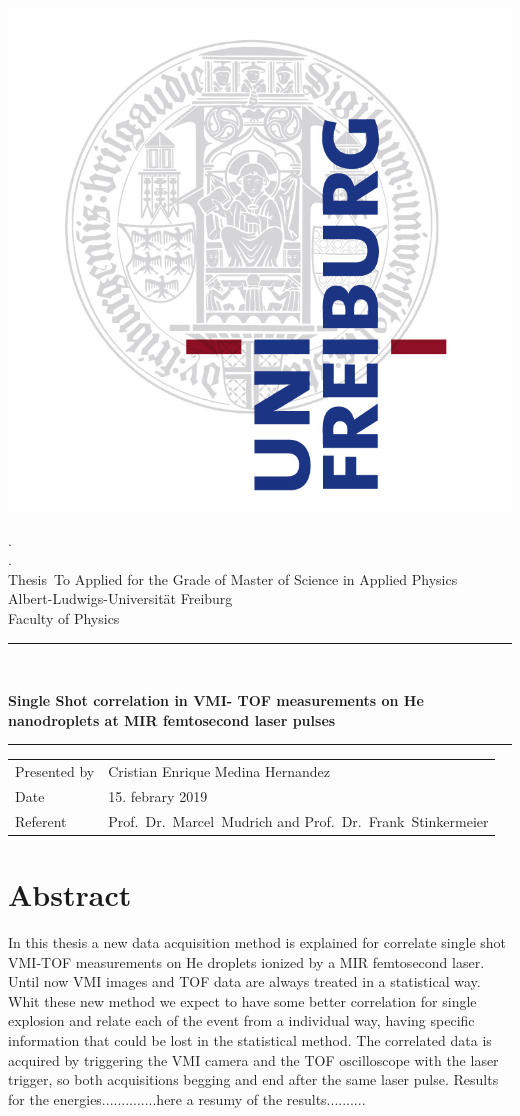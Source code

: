 \documentclass[a4paper,12pt,bibtotocnumbered, twosite]{scrreprt}
\newcommand{\titel}{Single Shot correlation in VMI- TOF measurements on He  nanodroplets at MIR femtosecond laser pulses}
\newcommand{\welchethesis}{To Applied for the Grade of Master of Science in Applied Physics}
\newcommand{\thesisofwas}{Thesis}
\newcommand{\welchesInstitute}{Faculty of Physics}
\newcommand{\welcheUni}{Albert-Ludwigs-Universität Freiburg}
\newcommand{\autor}{Cristian Enrique Medina Hernandez}
\newcommand{\datee}{15. febrary 2019} %
\newcommand{\referent}{ Prof.\ Dr.\ Marcel\ Mudrich and Prof.\ Dr.\ Frank\ Stinkermeier  }
\begin{document}
\begin{titlepage}
\centering
\includegraphics[width=7 cm]{logo}

\begin{center}    
    {\LARGE .} \\[0.5cm]
    {\large .} \\[5mm]
    {\large  \thesisofwas\ \welchethesis} \\ \welcheUni \\ \welchesInstitute  \\[5mm]
    \rule{\textwidth}{2pt}\\[0.5cm] 
    {\begin{spacing}{1.15} \huge \bfseries \titel \\
    \end{spacing}}
    \rule{\textwidth}{2pt}    
    \vfill 
 
    

 



    \begin{tabular}{ll} 
      Presented by & \autor \\
      Date & \datee \\
      Referent & \referent \\
    \end{tabular}  

\end{center}
    
\end{titlepage}


\chapter*{Abstract}

In this thesis a new data acquisition method is explained  for correlate single shot VMI-TOF measurements on He droplets ionized by a MIR femtosecond laser.  Until now VMI images and TOF data are always treated in a statistical way. Whit these new method we expect to have some better correlation for single explosion and relate each of the event from a  individual way, having specific information that could be lost in the statistical method.
The correlated data is acquired by triggering the VMI camera and the TOF oscilloscope with the laser trigger, so both acquisitions begging and end after the same laser pulse. Results for the energies..............here a resumy of the results..........
\end{document}
